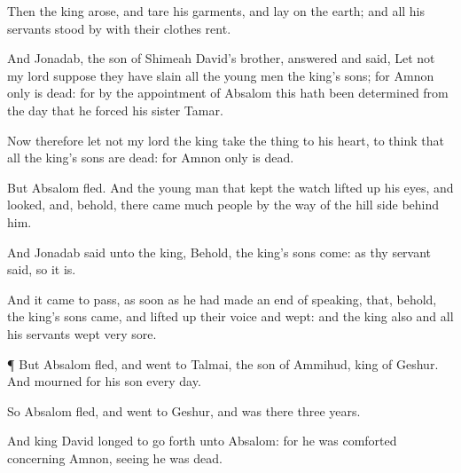 {Then the
king
arose, and
tare his
garments, and
lay on the
earth; and all his
servants
stood by with their
clothes
rent.

And
Jonadab, the
son of
Shimeah
David’s
brother,
answered and
said, Let not my
lord
suppose
{} they have
slain all the young
men the
king’s
sons; for
Amnon only is
dead: for by the
appointment of
Absalom this hath been
determined from the
day that he
forced his
sister
Tamar.

Now therefore let not my
lord the
king
take the
thing to his
heart, to
think that all the
king’s
sons are
dead: for
Amnon only is
dead.

But
Absalom
fled. And the young
man that kept the
watch lifted
up his
eyes, and
looked, and, behold, there
came
much
people by the
way of the
hill
side
behind him.

And
Jonadab
said unto the
king, Behold, the
king’s
sons
come: as thy
servant
said, so it is.

And it came to pass, as soon as he had made an
end of
speaking, that, behold, the
king’s
sons
came, and lifted
up their
voice and
wept: and the
king also and all his
servants
wept
very
sore.


\par }{\PP {}¶ But
Absalom
fled, and
went to
Talmai, the
son of
Ammihud,
king of
Geshur. And
{}
mourned for his
son every
day.

So
Absalom
fled, and
went to
Geshur, and was there
three
years.

And
{}
king
David
longed to go
forth unto
Absalom: for he was
comforted concerning
Amnon, seeing he was
dead.




\par }
